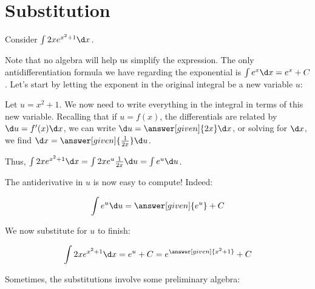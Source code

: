 \documentclass[nooutcomes]{ximera}
\begin{document}
  
\section{Substitution}



\begin{example}
Consider $\int 2x e^{x^2+1} \d x$.  

Note that no algebra will help us simplify the expression.  The only antidifferentiation formula we have regarding the exponential is $\int e^x \d x = e^x +C$.  Let's start by letting the exponent in the original integral be a new variable $u$:

Let $u= x^2+1$.  We now need to write everything in the integral in terms of this new variable.  Recalling that if $u = f(x)$, the differentials are related by $\d u = f'(x) \d x$, we can write $\d u = \answer[given]{2x} \d x$, or solving for $\d x$, we find $\d x = \answer[given]{\frac{1}{2x}} \d u$.

Thus, $\int 2x e^{x^2+1} \d x = \int 2x e^{u} \frac{1}{2x} \d u = \int e^u \d u$.

The antiderivative in $u$ is now easy to compute!  Indeed:

\[ \int e^u \d u = \answer[given]{e^u}+C \]

We now substitute for $u$ to finish:

\[\int 2xe^{x^2+1} \d x = e^u+C = e^{\answer[given]{x^2+1}}+C \]

\end{example}


Sometimes, the substitutions involve some preliminary algebra:
\end{document}
